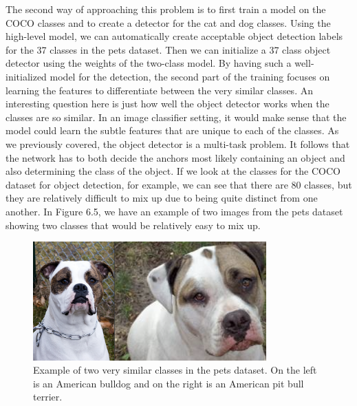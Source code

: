 The second way of approaching this problem is to first train a model on the COCO classes and to create a detector for the cat and dog classes.
Using the high-level model, we can automatically create acceptable object detection labels for the 37 classes in the pets dataset.
Then we can initialize a 37 class object detector using the weights of the two-class model.
By having such a well-initialized model for the detection, the second part of the training focuses on learning the features to differentiate between the very similar classes.
An interesting question here is just how well the object detector works when the classes are so similar.
In an image classifier setting, it would make sense that the model could learn the subtle features that are unique to each of the classes.
As we previously covered, the object detector is a multi-task problem. 
It follows that the network has to both decide the anchors most likely containing an object and also determining the class of the object.
If we look at the classes for the COCO dataset for object detection, for example, we can see that there are 80 classes, but they are relatively difficult to mix up due to being quite distinct from one another. 
In Figure 6.5, we have an example of two images from the pets dataset showing two classes that would be relatively easy to mix up.

\begin{figure}[h!] 
\centering 
\includegraphics[width=0.8\textwidth]{imgs/pets-example.png}
\caption{Example of two very similar classes in the pets dataset. On the left is an American bulldog and on the right is an American pit bull terrier.}
\end{figure}

